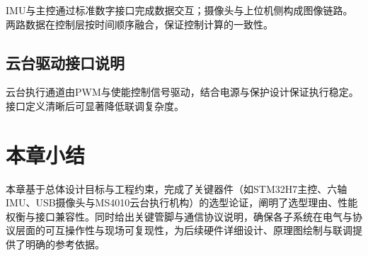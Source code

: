 IMU与主控通过标准数字接口完成数据交互；摄像头与上位机侧构成图像链路。两路数据在控制层按时间顺序融合，保证控制计算的一致性。

\subsection{云台驱动接口说明}

云台执行通道由PWM与使能控制信号驱动，结合电源与保护设计保证执行稳定。接口定义清晰后可显著降低联调复杂度。

\section{本章小结}

本章基于总体设计目标与工程约束，完成了关键器件（如STM32H7主控、六轴IMU、USB摄像头与MS4010云台执行机构）的选型论证，阐明了选型理由、性能权衡与接口兼容性。同时给出关键管脚与通信协议说明，确保各子系统在电气与协议层面的可互操作性与现场可复现性，为后续硬件详细设计、原理图绘制与联调提供了明确的参考依据。
